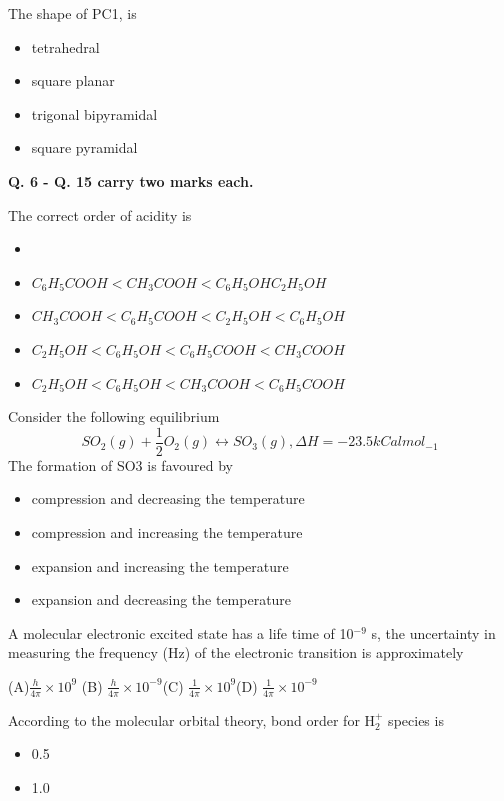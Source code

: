 \documentclass[journal]{IEEEtran}
\begin{document}
\begin{enumerate}
{\begin{itemize}
		\end{itemize}

	\item{ The shape of PC1, is}
		\begin{itemize}
			\item[(A)] tetrahedral 
			\item[(B)] square planar 
			\item[(C)] trigonal bipyramidal
			\item[(D)] square pyramidal

		\end{itemize}

	\textbf{Q. 6 - Q. 15 carry two marks each.}

	\item{ The correct order of acidity is}
		\begin{itemize}
			\item[(A)]
			\item[(A)] $C_6H_5COOH < CH_3COOH < C_6H_5OH C_2H_5OH$
		\item[(B)] $CH_3COOH < C_6H_5COOH < C_2H_5OH < C_6H_5OH$
			\item[(C)] $C_2H_5OH < C_6H_5OH < C_6H_5COOH < CH_3COOH$
			\item[(D)] $C_2H_5OH < C_6H_5OH< CH_3COOH < C_6H_5COOH$

		\end{itemize}

	\item{ Consider the following equilibrium \[ SO_2 (g) + \frac{1}{2} O_2 (g)\leftrightarrow SO_3 (g), \Delta H =-23.5 kCal mol_{-1} \]
		The formation of SO3 is favoured by}
		
		\begin{itemize}
	\item[(A)] compression and decreasing the temperature

	\item[(B)] compression and increasing the temperature

	\item[(C)] expansion and increasing the temperature 
	\item[(D)] expansion and decreasing the temperature
		\end{itemize}

	\item {A molecular electronic excited state has a life time of 10$^{-9}$ s, the uncertainty in measuring the frequency (Hz) of the electronic transition is approximately}


		(A)$\frac{h}{4\pi} \times 10^{9}$ \hspace{10mm} (B) $\frac{h}{4\pi} \times 10^{-9}$\hspace{10mm}(C) $\frac{1}{4\pi} \times 10^{9}$\hspace{10mm}(D) $\frac{1}{4\pi} \times 10^{-9}$
	\item {According to the molecular orbital theory, bond order for H$_2^+$ species is}
	\begin{itemize}
\item[(A)] 0.5
\item[(B)] 1.0


\end{itemize}}
\end{enumerate}
\end{document}

